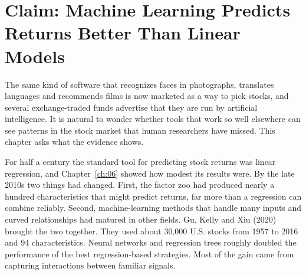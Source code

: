 \makeatletter
{}
\makeatother

\makeatletter
\makeatother

\chapter{Claim: Machine Learning Predicts Returns Better Than Linear Models}
\label{ch:19}
\providecommand{\term}[1]{\emph{#1}}

The same kind of software that recognizes faces in photographs, translates languages and recommends films is now marketed as a way to pick stocks, and several exchange-traded funds advertise that they are run by artificial intelligence. It is natural to wonder whether tools that work so well elsewhere can see patterns in the stock market that human researchers have missed. This chapter asks what the evidence shows.

For half a century the standard tool for predicting stock returns was linear regression, and Chapter~\ref{ch:06} showed how modest its results were. By the late 2010s two things had changed. First, the factor zoo had produced nearly a hundred characteristics that might predict returns, far more than a regression can combine reliably. Second, machine-learning methods that handle many inputs and curved relationships had matured in other fields. Gu, Kelly and Xiu (2020) brought the two together. They used about 30,000 U.S. stocks from 1957 to 2016 and 94 characteristics. Neural networks and regression trees roughly doubled the performance of the best regression-based strategies. Most of the gain came from capturing interactions between familiar signals.

